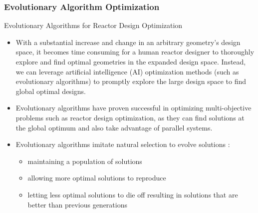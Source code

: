   \begin{frame}
    \frametitle{Evolutionary Algorithm Optimization}
    \begin{block}{Evolutionary Algorithms for Reactor Design Optimization}
        \begin{itemize}
            \item With a substantial increase and change in an arbitrary geometry's design space, it
            becomes time consuming for a human reactor designer to thoroughly explore and find optimal
            geometries in the expanded design space. Instead, we can leverage artificial intelligence (AI)
            optimization methods (such as evolutionary algorithms) to promptly explore the large design
            space to find global optimal designs.
            \item Evolutionary algorithms have proven successful in optimizing multi-objective 
            problems such as reactor design optimization, as they can find solutions at the global 
            optimum and also take advantage of parallel systems. 
            \item Evolutionary algorithms imitate natural selection to evolve solutions 
            \cite{renner_genetic_2003}:
            \begin{itemize}
                \item maintaining a population of solutions
                \item allowing more optimal solutions to reproduce 
                \item letting less optimal solutions to die off resulting in 
                solutions that are better than previous generations
            \end{itemize}
            \end{itemize}
    \end{block}
  \end{frame}
    